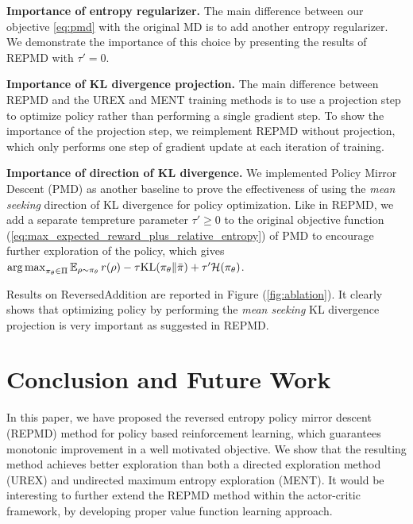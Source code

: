 \textbf{Importance of entropy regularizer.} The main difference between our objective \cref{eq:pmd} with the original MD is to add another entropy regularizer. We demonstrate the importance of this choice by presenting the results of REPMD with $\tau'=0$.

\textbf{Importance of KL divergence projection.} The main difference between REPMD and the UREX and MENT training methods is to use a projection step to optimize policy rather than performing a single gradient step. To show the importance of the projection step, we reimplement REPMD without projection, which only performs one step of gradient update at each iteration of training. 

\textbf{Importance of direction of KL divergence.} We implemented Policy Mirror Descent (PMD) as another baseline to prove the effectiveness of using the \emph{mean seeking} direction of KL divergence for policy optimization. Like in REPMD, we add a separate tempreture parameter $\tau'\geq 0$ to the original objective function (\ref{eq:max_expected_reward_plus_relative_entropy}) of PMD to encourage further exploration of the policy, which gives $\operatorname*{arg\,max}_{\pi_\theta \in \Pi}{ \operatorname*{\mathbb{E}}_{\rho \sim \pi_\theta}{  r(\rho)  - \tau \text{KL}(\pi_\theta \| \bar{\pi}) } + \tau'\mathcal{H}(\pi_\theta) }$.

Results on ReversedAddition are reported in Figure (\ref{fig:ablation}). It clearly shows that optimizing policy by performing the \emph{mean seeking} KL divergence projection is very important as suggested in REPMD. 


\section{Conclusion and Future Work}
\label{sec:conclusion_and_future_work}

In this paper, we have proposed the reversed entropy policy mirror descent (REPMD) method for policy based reinforcement learning, which guarantees monotonic improvement in a well motivated objective. We show that the resulting method achieves better exploration than both a directed exploration method (UREX) and undirected maximum entropy exploration (MENT). It would be interesting to further extend the REPMD method within the actor-critic framework, by developing proper value function learning approach. %
